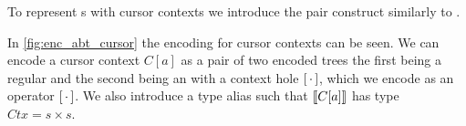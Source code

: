 \documentclass[sigplan,screen]{acmart}
\begin{document}
To represent {\abt}s with cursor contexts we introduce the pair construct similarly to \cite{types_programming_languages}.


In \cref{fig:enc_abt_cursor} the encoding for cursor contexts can be seen. We can encode a cursor context $C[a]$ as a pair of two encoded trees the first being a regular \abt and the second being an \abt with a context hole $[ \, \cdot \, ]$, which we encode as an operator $[ \, \cdot \, ]$. We also introduce a type alias such that $\llbracket C[a] \rrbracket$ has type $Ctx = s \times s$.

\end{document}
